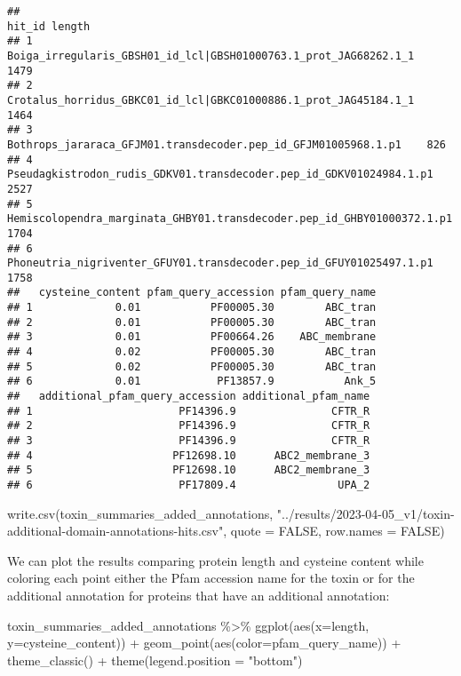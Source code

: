 \documentclass[
]{article}
\newenvironment{Shaded}{\begin{snugshade}}{\end{snugshade}}
\newcommand{\AttributeTok}[1]{\textcolor[rgb]{0.77,0.63,0.00}{#1}}
\newcommand{\ConstantTok}[1]{\textcolor[rgb]{0.00,0.00,0.00}{#1}}
\newcommand{\FunctionTok}[1]{\textcolor[rgb]{0.00,0.00,0.00}{#1}}
\newcommand{\NormalTok}[1]{#1}
\newcommand{\SpecialCharTok}[1]{\textcolor[rgb]{0.00,0.00,0.00}{#1}}
\newcommand{\StringTok}[1]{\textcolor[rgb]{0.31,0.60,0.02}{#1}}
\begin{document}
\begin{verbatim}
##                                                                   hit_id length
## 1       Boiga_irregularis_GBSH01_id_lcl|GBSH01000763.1_prot_JAG68262.1_1   1479
## 2       Crotalus_horridus_GBKC01_id_lcl|GBKC01000886.1_prot_JAG45184.1_1   1464
## 3         Bothrops_jararaca_GFJM01.transdecoder.pep_id_GFJM01005968.1.p1    826
## 4    Pseudagkistrodon_rudis_GDKV01.transdecoder.pep_id_GDKV01024984.1.p1   2527
## 5 Hemiscolopendra_marginata_GHBY01.transdecoder.pep_id_GHBY01000372.1.p1   1704
## 6    Phoneutria_nigriventer_GFUY01.transdecoder.pep_id_GFUY01025497.1.p1   1758
##   cysteine_content pfam_query_accession pfam_query_name
## 1             0.01           PF00005.30        ABC_tran
## 2             0.01           PF00005.30        ABC_tran
## 3             0.01           PF00664.26    ABC_membrane
## 4             0.02           PF00005.30        ABC_tran
## 5             0.02           PF00005.30        ABC_tran
## 6             0.01            PF13857.9           Ank_5
##   additional_pfam_query_accession additional_pfam_name
## 1                       PF14396.9               CFTR_R
## 2                       PF14396.9               CFTR_R
## 3                       PF14396.9               CFTR_R
## 4                      PF12698.10      ABC2_membrane_3
## 5                      PF12698.10      ABC2_membrane_3
## 6                       PF17809.4                UPA_2
\end{verbatim}

\begin{Shaded}
\begin{Highlighting}[]
\FunctionTok{write.csv}\NormalTok{(toxin\_summaries\_added\_annotations, }\StringTok{"../results/2023{-}04{-}05\_v1/toxin{-}additional{-}domain{-}annotations{-}hits.csv"}\NormalTok{, }\AttributeTok{quote =} \ConstantTok{FALSE}\NormalTok{, }\AttributeTok{row.names =} \ConstantTok{FALSE}\NormalTok{)}
\end{Highlighting}
\end{Shaded}

We can plot the results comparing protein length and cysteine content
while coloring each point either the Pfam accession name for the toxin
or for the additional annotation for proteins that have an additional
annotation:

\begin{Shaded}
\begin{Highlighting}[]
\NormalTok{toxin\_summaries\_added\_annotations }\SpecialCharTok{\%\textgreater{}\%} 
  \FunctionTok{ggplot}\NormalTok{(}\FunctionTok{aes}\NormalTok{(}\AttributeTok{x=}\NormalTok{length, }\AttributeTok{y=}\NormalTok{cysteine\_content)) }\SpecialCharTok{+} 
  \FunctionTok{geom\_point}\NormalTok{(}\FunctionTok{aes}\NormalTok{(}\AttributeTok{color=}\NormalTok{pfam\_query\_name)) }\SpecialCharTok{+}
  \FunctionTok{theme\_classic}\NormalTok{() }\SpecialCharTok{+} 
  \FunctionTok{theme}\NormalTok{(}\AttributeTok{legend.position =} \StringTok{"bottom"}\NormalTok{)}
\end{Highlighting}
\end{Shaded}
\end{document}

